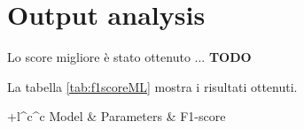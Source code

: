 \section{Output analysis}
        
        Lo score migliore è stato ottenuto ... \textbf{TODO}
        \bigbreak
        
        La tabella \ref{tab:f1scoreML} mostra i risultati ottenuti.
        
        \begin{center}
                \begin{tabular}{+l^c^c}
                        \toprule\rowstyle{\bfseries}
                        Model & Parameters & F1-score \\
                        \toprule
                        

\end{tabular}
\end{center}
